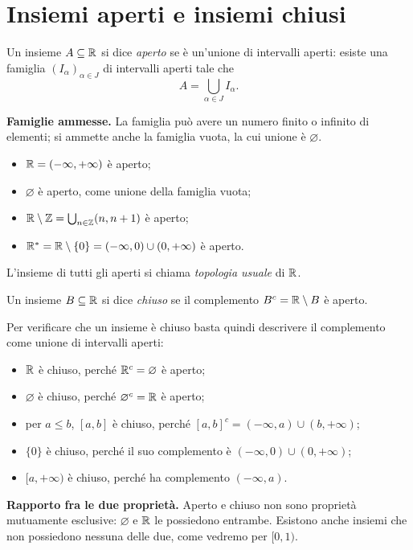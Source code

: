 \section{Insiemi aperti e insiemi chiusi}

\begin{definizione}
Un insieme $A\subseteq\mathbb{R}$ si dice \emph{aperto} se è un'unione di intervalli aperti: esiste una famiglia $(I_\alpha)_{\alpha\in J}$ di intervalli aperti tale che
\[
A=\bigcup_{\alpha\in J}I_\alpha.
\]
\end{definizione}

\textbf{Famiglie ammesse.} La famiglia può avere un numero finito o infinito di elementi; si ammette anche la famiglia vuota, la cui unione è $\varnothing$.

\begin{esempio}
\leavevmode
\begin{itemize}
  \item $\mathbb{R}=(-\infty,+\infty)$ è aperto;
  \item $\varnothing$ è aperto, come unione della famiglia vuota;
  \item $\mathbb{R}\setminus\mathbb{Z}=\bigcup_{n\in\mathbb{Z}}(n,n+1)$ è aperto;
  \item $\mathbb{R}^*=\mathbb{R}\setminus\{0\}=(-\infty,0)\cup(0,+\infty)$ è aperto.
\end{itemize}
\end{esempio}
L'insieme di tutti gli aperti si chiama \emph{topologia usuale} di $\mathbb{R}$.

\begin{definizione}
Un insieme $B\subseteq\mathbb{R}$ si dice \emph{chiuso} se il complemento $B^c=\mathbb{R}\setminus B$ è aperto.
\end{definizione}

\begin{esempio}
Per verificare che un insieme è chiuso basta quindi descrivere il complemento come unione di intervalli aperti:
\begin{itemize}
  \item $\mathbb{R}$ è chiuso, perché $\mathbb{R}^c=\varnothing$ è aperto;
  \item $\varnothing$ è chiuso, perché $\varnothing^c=\mathbb{R}$ è aperto;
  \item per $a\le b$, $[a,b]$ è chiuso, perché $[a,b]^c=(-\infty,a)\cup(b,+\infty)$;
  \item $\{0\}$ è chiuso, perché il suo complemento è $(-\infty,0)\cup(0,+\infty)$;
  \item $[a,+\infty)$ è chiuso, perché ha complemento $(-\infty,a)$.
\end{itemize}
\end{esempio}
\textbf{Rapporto fra le due proprietà.} Aperto e chiuso non sono proprietà mutuamente esclusive: $\varnothing$ e $\mathbb{R}$ le possiedono entrambe. Esistono anche insiemi che non possiedono nessuna delle due, come vedremo per $[0,1)$.

